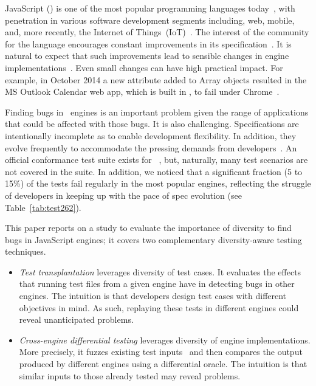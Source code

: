 \documentclass[sigconf,review, anonymous]{acmart}
\begin{document}
JavaScript (\js{}) is one of the most popular programming languages
today~\cite{stackify,redmonk-javascript}, with penetration in various software development segments including, web, mobile,
and, more recently, the Internet of
Things~(IoT)~\cite{simply-technologies}. The interest of the community
for the language encourages constant improvements in its specification~\cite{ecmas262-spec}. It is natural to expect that such improvements
lead to sensible changes in engine implementations~\cite{kangax}. Even small
changes can have high practical impact. For example, in October 2014 a
new attribute added to Array objects resulted in the MS Outlook
Calendar web app, which is built in \js{}, to fail under 
Chrome~\cite{array-bug-chromium-issue4247,array-bug-discussion}.

Finding bugs in \js\ engines is an important problem given the range
of applications that could be affected with those bugs. It is also
challenging.  Specifications are intentionally incomplete as to enable
development flexibility. In addition, they evolve frequently to
accommodate the pressing demands from
developers~\cite{ecmas262-spec-repo}. An official conformance test
suite exists for \js~\cite{tc39-github}, but, naturally, many test
scenarios are not covered in the suite. In addition, we noticed that a
significant fraction (5 to 15\%) of the tests fail regularly in the
most popular engines, reflecting the struggle of developers in keeping
up with the pace of spec evolution (see Table~\ref{tab:test262}).

This paper reports on a study to evaluate the importance of diversity
to find bugs in JavaScript engines; it covers two complementary
diversity-aware testing techniques.

\begin{itemize}[topsep=0pt,parsep=0pt,partopsep=2pt,labelwidth=0cm,align=left,itemindent=-0.25cm]
\item \emph{Test transplantation} leverages diversity of test
  cases. It evaluates the effects that running test files from a given
  engine have in detecting bugs in other engines. The intuition is
  that developers design test cases with different objectives in
  mind. As such, replaying these tests in different engines could
  reveal unanticipated problems.

\item \emph{Cross-engine differential testing} leverages diversity of
  engine implementations. More precisely, it fuzzes existing test
  inputs~\cite{fuzz-testing-history} and then compares the output
  produced by different engines using a differential oracle. The
  intuition is that similar inputs to those already tested may reveal
  problems.
\end{itemize}
\end{document}
